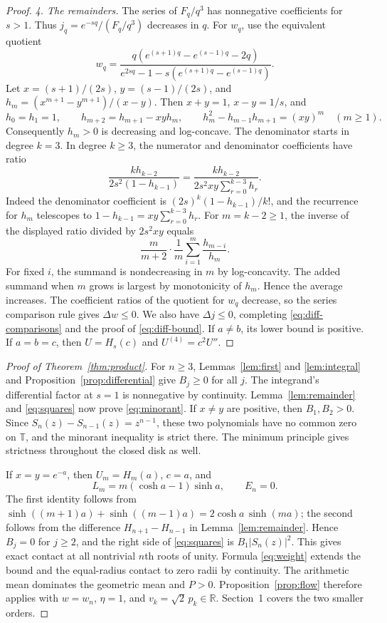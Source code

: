\documentclass[10pt,twoside,reqno]{amsart}
\numberwithin{equation}{section}
\newcommand{\R}{\mathbb R}
\newcommand{\T}{\mathbb T}
\begin{document}
\begin{proof}
\medskip\noindent
\textit{4. The remainders.}
The series of \(F_q/q^3\) has nonnegative coefficients for \(s>1\).
Thus \(j_q=e^{-sq}/(F_q/q^3)\) decreases in \(q\).
For \(w_q\), use the equivalent quotient
\[
 w_q=\frac{q(e^{(s+1)q}-e^{(s-1)q}-2q)}
             {e^{2sq}-1-s(e^{(s+1)q}-e^{(s-1)q})}.
\]
Let \(x=(s+1)/(2s)\), \(y=(s-1)/(2s)\), and
\(h_m=(x^{m+1}-y^{m+1})/(x-y)\). Then \(x+y=1\), \(x-y=1/s\), and
\[
 h_0=h_1=1,\qquad h_{m+2}=h_{m+1}-xyh_m,\qquad
 h_m^2-h_{m-1}h_{m+1}=(xy)^m\quad(m\ge1).
\]
Consequently \(h_m>0\) is decreasing and log-concave.
The denominator starts in degree \(k=3\). In degree \(k\ge3\),
the numerator and denominator coefficients have ratio
\[
 \frac{k h_{k-2}}{2s^2(1-h_{k-1})}
 =\frac{k h_{k-2}}{2s^2xy\sum_{r=0}^{k-3}h_r}.
\]
Indeed the denominator coefficient is \((2s)^k(1-h_{k-1})/k!\),
and the recurrence for \(h_m\) telescopes to
\(1-h_{k-1}=xy\sum_{r=0}^{k-3}h_r\).
For \(m=k-2\ge1\), the inverse of the displayed ratio divided by
\(2s^2xy\) equals
\[
 \frac{m}{m+2}\cdot\frac{1}{m}\sum_{i=1}^m\frac{h_{m-i}}{h_m}.
\]
For fixed \(i\), the summand is nondecreasing in \(m\) by log-concavity.
The added summand when \(m\) grows is largest by monotonicity of \(h_m\).
Hence the average increases. The coefficient ratios of the quotient
for \(w_q\) decrease, so the series comparison rule gives
\(\Delta w\le0\). We also have \(\Delta j\le0\), completing
\eqref{eq:diff-comparisons} and the proof of \eqref{eq:diff-bound}.
If \(a\ne b\), its lower bound is positive. If \(a=b=c\), then
\(U=H_s(c)\) and \(U^{(4)}=c^2 U''\).
\end{proof}

\begin{proof}[Proof of Theorem~\ref{thm:product}]
For \(n\ge3\), Lemmas~\ref{lem:first} and \ref{lem:integral} and
Proposition~\ref{prop:differential} give \(B_j\ge0\) for all \(j\).
The integrand's differential factor at \(s=1\) is nonnegative by continuity.
Lemma~\ref{lem:remainder} and \eqref{eq:squares} now prove \eqref{eq:minorant}.
If \(x\ne y\) are positive, then \(B_1,B_2>0\).
Since \(S_n(z)-S_{n-1}(z)=z^{n-1}\), these two polynomials have no common
zero on \(\T\), and the minorant inequality is strict there. The minimum
principle gives strictness throughout the closed disk as well.

If \(x=y=e^{-a}\), then \(U_m=H_m(a)\), \(c=a\), and
\[
 L_m=m(\cosh a-1)\sinh a,\qquad E_n=0 .
\]
The first identity follows from
\(\sinh((m+1)a)+\sinh((m-1)a)=2\cosh a\,\sinh(ma)\);
the second follows from the difference \(H_{n+1}-H_{n-1}\) in
Lemma~\ref{lem:remainder}. Hence \(B_j=0\) for \(j\ge2\), and the right
side of \eqref{eq:squares} is \(B_1|S_n(z)|^2\). This gives exact contact at
all nontrivial \(n\)th roots of unity. Formula \eqref{eq:weight} extends
the bound and the equal-radius contact to zero radii by continuity.
The arithmetic mean dominates the geometric mean and \(P>0\).
Proposition~\ref{prop:flow} therefore applies with \(w=w_n\), \(\eta=1\),
and \(v_k=\sqrt2\,p_k\in\R\). Section~1 covers the two smaller orders.
\end{proof}
\end{document}
